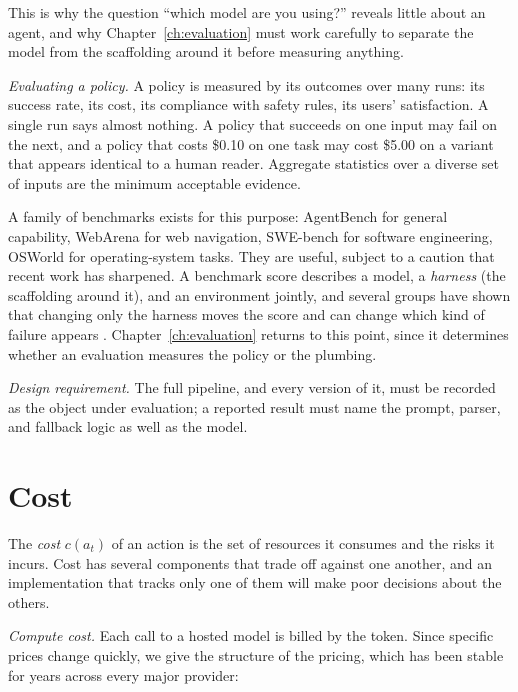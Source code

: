 \documentclass[11pt]{book}
\begin{document}
This is why the question ``which model are you using?'' reveals little about an agent, and why Chapter~\ref{ch:evaluation} must work carefully to separate the model from the scaffolding around it before measuring anything.

\textit{Evaluating a policy.} A policy is measured by its outcomes over many runs: its success rate, its cost, its compliance with safety rules, its users' satisfaction. A single run says almost nothing. A policy that succeeds on one input may fail on the next, and a policy that costs \$0.10 on one task may cost \$5.00 on a variant that appears identical to a human reader. Aggregate statistics over a diverse set of inputs are the minimum acceptable evidence.

A family of benchmarks exists for this purpose: AgentBench \cite{liu2023agentbench} for general capability, WebArena \cite{zhou2024webarena} for web navigation, SWE-bench \cite{jimenez2024swebench} for software engineering, OSWorld \cite{xie2024osworld} for operating-system tasks. They are useful, subject to a caution that recent work has sharpened. A benchmark score describes a model, a \textit{harness} (the scaffolding around it), and an environment jointly, and several groups have shown that changing only the harness moves the score and can change which kind of failure appears \cite{modelharness2026, harnessdiverge2026, uniace2026}. Chapter~\ref{ch:evaluation} returns to this point, since it determines whether an evaluation measures the policy or the plumbing.

\textit{Design requirement.} The full pipeline, and every version of it, must be recorded as the object under evaluation; a reported result must name the prompt, parser, and fallback logic as well as the model.

\section{Cost}

The \emph{cost} $c(a_t)$ of an action is the set of resources it consumes and the risks it incurs. Cost has several components that trade off against one another, and an implementation that tracks only one of them will make poor decisions about the others.

\textit{Compute cost.} Each call to a hosted model is billed by the token. Since specific prices change quickly, we give the structure of the pricing, which has been stable for years across every major provider:
\end{document}
